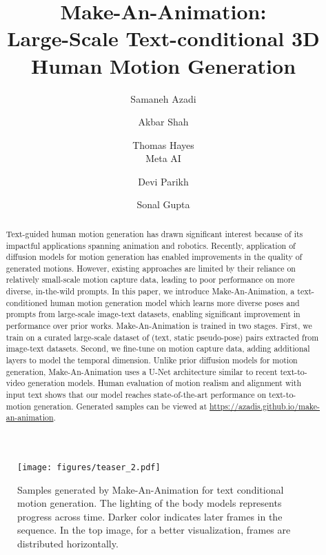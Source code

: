 \documentclass[10pt,twocolumn,letterpaper]{article}
\begin{document}
\title{ Make-An-Animation: \\ Large-Scale Text-conditional 3D Human Motion Generation}

\author{Samaneh Azadi
\and
Akbar Shah
\and Thomas Hayes\\
Meta AI
\and Devi Parikh
\and Sonal Gupta 
\\
}

\maketitle
\ificcvfinal\thispagestyle{empty}\fi



\begin{abstract}
Text-guided human motion generation has drawn significant interest because of its impactful applications spanning animation and robotics. Recently, application of diffusion models for motion generation has enabled improvements in the quality of generated motions. However, existing approaches are limited by their reliance on relatively small-scale motion capture data, leading to poor performance on more diverse, in-the-wild prompts. In this paper, we introduce Make-An-Animation, a text-conditioned human motion generation model which learns more diverse poses and prompts from large-scale image-text datasets, enabling significant improvement in performance over prior works. Make-An-Animation is trained in two stages. First, we train on a curated large-scale dataset of (text, static pseudo-pose) pairs extracted from image-text datasets. Second, we fine-tune on motion capture data, adding additional layers to model the temporal dimension. Unlike prior diffusion models for motion generation, Make-An-Animation uses a U-Net architecture similar to recent text-to-video generation models. Human evaluation of motion realism and alignment with input text shows that our model reaches state-of-the-art performance on text-to-motion generation. Generated samples can be viewed at \href{https://azadis.github.io/make-an-animation}{https://azadis.github.io/make-an-animation}.

   
\end{abstract}


\begin{figure}
  \centering \texttt{[image: figures/teaser\_2.pdf]}
  \caption{Samples generated by Make-An-Animation for text conditional motion generation. The lighting of the body models represents progress across time. Darker color indicates later frames in the sequence. In the top image, for a better visualization, frames are distributed horizontally. }
  \label{fig:teaser}
\end{figure}
\end{document}
